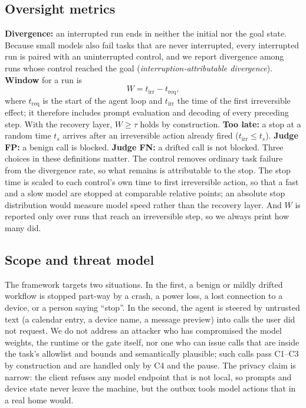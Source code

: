 \documentclass[conference]{IEEEtran}
\begin{document}
\subsection{Oversight metrics}
\textbf{Divergence:} an interrupted run ends in neither the initial nor the goal state. Because small models also fail tasks that are never interrupted, every interrupted run is paired with an uninterrupted control, and we report divergence among runs whose control reached the goal (\emph{interruption-attributable divergence}). \textbf{Window} for a run is
\begin{equation}W=t_{\mathrm{irr}}-t_{\mathrm{req}},\end{equation}
where $t_{\mathrm{req}}$ is the start of the agent loop and $t_{\mathrm{irr}}$ the time of the first irreversible effect; it therefore includes prompt evaluation and decoding of every preceding step. With the recovery layer, $W\ge\tau$ holds by construction. \textbf{Too late:} a stop at a random time $t_s$ arrives after an irreversible action already fired ($t_{\mathrm{irr}}\le t_s$). \textbf{Judge FP:} a benign call is blocked. \textbf{Judge FN:} a drifted call is not blocked. Three choices in these definitions matter. The control removes ordinary task failure from the divergence rate, so what remains is attributable to the stop. The stop time is scaled to each control's own time to first irreversible action, so that a fast and a slow model are stopped at comparable relative points; an absolute stop distribution would measure model speed rather than the recovery layer. And $W$ is reported only over runs that reach an irreversible step, so we always print how many did.

\subsection{Scope and threat model}
The framework targets two situations. In the first, a benign or mildly drifted workflow is stopped part-way by a crash, a power loss, a lost connection to a device, or a person saying ``stop''. In the second, the agent is steered by untrusted text (a calendar entry, a device name, a message preview) into calls the user did not request. We do not address an attacker who has compromised the model weights, the runtime or the gate itself, nor one who can issue calls that are inside the task's allowlist and bounds and semantically plausible; such calls pass C1--C3 by construction and are handled only by C4 and the pause. The privacy claim is narrow: the client refuses any model endpoint that is not local, so prompts and device state never leave the machine, but the outbox tools model actions that in a real home would.
\end{document}
